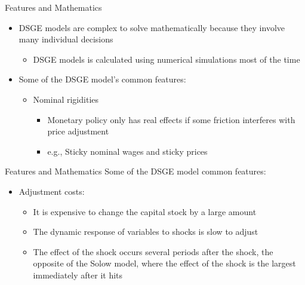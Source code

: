 \documentclass[aspectratio=1610]{beamer}
\begin{document}
\begin{frame}[wide]{Features and Mathematics}
	\begin{itemize}
		\item DSGE models are complex to solve mathematically because they involve many individual decisions
		\begin{itemize}
			\item DSGE models is calculated using numerical simulations most of the time
		\end{itemize}
		\item Some of the DSGE model's common features:
		\begin{itemize}
			\item Nominal rigidities
			\begin{itemize}
				\item Monetary policy only has real effects if some friction interferes with price adjustment
				\item e.g., Sticky nominal wages and sticky prices
			\end{itemize}
		\end{itemize}
	\end{itemize}
\end{frame}

\begin{frame}[wide]{Features and Mathematics}
	Some of the DSGE model common features:
	\begin{itemize}
		\item Adjustment costs: 
		\begin{itemize}
			\item It is expensive to change the capital stock by a large amount
			\item The dynamic response of variables to shocks is slow to adjust
			\item The effect of the shock occurs several periods after the shock, the opposite of the Solow model, where the effect of the shock is the largest immediately after it hits
		\end{itemize}
	\end{itemize}
\end{frame}
\end{document}
